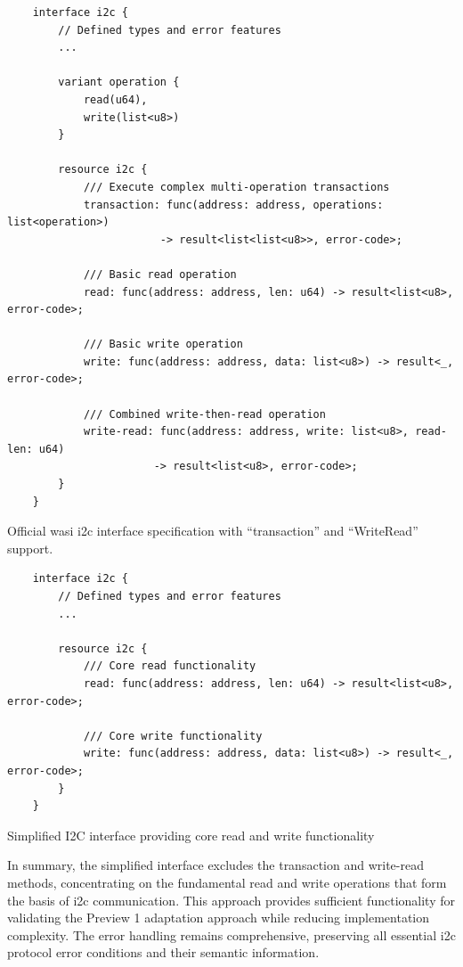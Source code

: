 \begin{listing}[H]
    \begin{verbatim}
    interface i2c {
        // Defined types and error features
        ... 
        
        variant operation {
            read(u64),
            write(list<u8>)
        }
    
        resource i2c {
            /// Execute complex multi-operation transactions
            transaction: func(address: address, operations: list<operation>) 
                        -> result<list<list<u8>>, error-code>;
            
            /// Basic read operation
            read: func(address: address, len: u64) -> result<list<u8>, error-code>;
            
            /// Basic write operation  
            write: func(address: address, data: list<u8>) -> result<_, error-code>;
            
            /// Combined write-then-read operation
            write-read: func(address: address, write: list<u8>, read-len: u64) 
                       -> result<list<u8>, error-code>;
        }
    }
    \end{verbatim}
    \caption{Official \acrshort{wasi} \acrshort{i2c} interface specification with ``transaction'' and ``WriteRead'' support.}
    \label{lst:official-i2c-interface}
\end{listing}

\begin{listing}[H]
    \begin{verbatim}
    interface i2c {
        // Defined types and error features
        ... 
    
        resource i2c {
            /// Core read functionality
            read: func(address: address, len: u64) -> result<list<u8>, error-code>;
            
            /// Core write functionality
            write: func(address: address, data: list<u8>) -> result<_, error-code>;
        }
    }
    \end{verbatim}
    \caption{Simplified I2C interface providing core read and write functionality}
    \label{lst:simplified-i2c-interface}
\end{listing}

In summary, the simplified interface excludes the transaction and write-read methods, concentrating on the fundamental read and write operations that form the basis of \acrshort{i2c} communication. This approach provides sufficient functionality for validating the Preview 1 adaptation approach while reducing implementation complexity. The error handling remains comprehensive, preserving all essential \acrshort{i2c} protocol error conditions and their semantic information.


